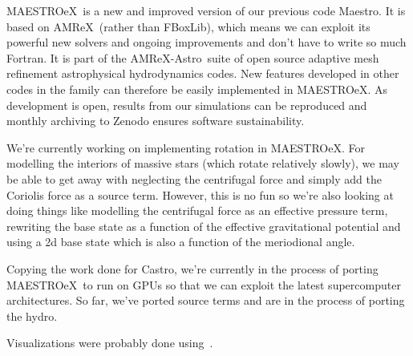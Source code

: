 \documentclass[a4paper]{jpconf}
\newcommand{\maestro}{{\sffamily Maestro}}
\newcommand{\maestroex}{{\sffamily MAESTROeX}}
\newcommand{\castro}{{\sffamily Castro}}
\newcommand{\amrex}{{\sffamily AMReX}}
\newcommand{\amrexastro}{{\sffamily AMReX-Astro}}
\newcommand{\fboxlib}{{\sffamily FBoxLib}}
\begin{document}
\maestroex~is a new and improved version of our previous code \maestro. It is based on \amrex~(rather than \fboxlib), which means we can exploit its powerful new solvers and ongoing improvements and don't have to write so much Fortran. It is part of the \amrexastro~suite of open source adaptive mesh refinement astrophysical hydrodynamics codes. New features developed in other codes in the family can therefore be easily implemented in \maestroex. As development is open, results from our simulations can be reproduced and monthly archiving to Zenodo ensures software sustainability.

We're currently working on implementing rotation in \maestroex. For modelling the interiors of massive stars (which rotate relatively slowly), we may be able to get away with neglecting the centrifugal force and simply add the Coriolis force as a source term. However, this is no fun so we're also looking at doing things like modelling the centrifugal force as an effective pressure term, rewriting the base state as a function of the effective gravitational potential and using a 2d base state which is also a function of the meriodional angle.

Copying the work done for \castro, we're currently in the process of porting \maestroex~to run on GPUs so that we can exploit the latest supercomputer architectures. So far, we've ported source terms and are in the process of porting the hydro. 




\ack Visualizations were probably done using~\cite{yt}.




\end{document}
